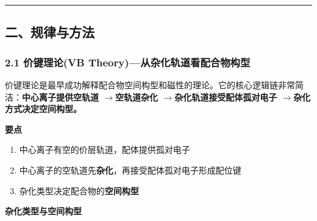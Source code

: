 \documentclass[a4paper,11pt]{ctexart}
\providecommand{\tightlist}{\setlength{\itemsep}{0pt}\setlength{\parskip}{0pt}}
\newcommand{\箭}{\ensuremath{\rightarrow}}
\newcommand{\左箭}{\ensuremath{\leftarrow}}
\newcommand{\上箭}{\ensuremath{\uparrow}}
\newcommand{\下箭}{\ensuremath{\downarrow}}
\newcommand{\衡}{\ensuremath{\rightleftharpoons}}
\newcommand{\双箭}{\ensuremath{\leftrightarrow}}
\newcommand{\约等于}{\ensuremath{\approx}}
\newcommand{\小于等于}{\ensuremath{\leq}}
\newcommand{\大于等于}{\ensuremath{\geq}}
\newcommand{\不等于}{\ensuremath{\neq}}
\newcommand{\西格马}{\ensuremath{\sigma}}
\newcommand{\派}{\ensuremath{\pi}}
\begin{document}
\begin{center}\rule{0.5\linewidth}{0.5pt}\end{center}

\subsection{二、规律与方法}\label{ux4e8cux89c4ux5f8bux4e0eux65b9ux6cd5}

\subsubsection{2.1 价键理论(VB Theory)---从杂化轨道看配合物构型}\label{ux4ef7ux952eux7406ux8bbavb-theoryux4eceux6742ux5316ux8f68ux9053ux770bux914dux5408ux7269ux6784ux578b}

价键理论是最早成功解释配合物空间构型和磁性的理论。它的核心逻辑链非常简洁：\textbf{中心离子提供空轨道 \箭 空轨道杂化 \箭 杂化轨道接受配体孤对电子 \箭 杂化方式决定空间构型。}

\textbf{要点}

\begin{enumerate}
\def\labelenumi{\arabic{enumi}.}
\tightlist
\item
  中心离子有空的价层轨道，配体提供孤对电子
\item
  中心离子的空轨道先\textbf{杂化}，再接受配体孤对电子形成配位键
\item
  杂化类型决定配合物的\textbf{空间构型}
\end{enumerate}

\textbf{杂化类型与空间构型}
\end{document}

